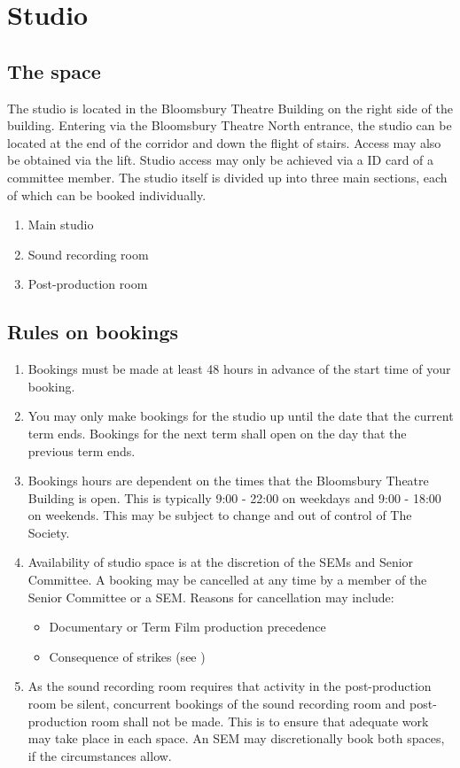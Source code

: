 \documentclass[]{article}
\begin{document}
\section{Studio}
\subsection{The space}\label{studioSpaces}
The studio is located in the Bloomsbury Theatre Building on the right side of the building. Entering via the Bloomsbury Theatre North entrance, the studio can be located at the end of the corridor and down the flight of stairs. Access may also be obtained via the lift. Studio access may only be achieved via a ID card of a committee member. The studio itself is divided up into three main sections, each of which can be booked individually.
\begin{enumerate}
    \item Main studio
    \item Sound recording room
    \item Post-production room
\end{enumerate}
\subsection{Rules on bookings}
\begin{enumerate}
    \item Bookings must be made at least 48 hours in advance of the start time of your booking.
    \item You may only make bookings for the studio up until the date that the current term ends. Bookings for the next term shall open on the day that the previous term ends.
    \item Bookings hours are dependent on the times that the Bloomsbury Theatre Building is open. This is typically 9:00 - 22:00 on weekdays and 9:00 - 18:00 on weekends. This may be subject to change and out of control of The Society.
    \item Availability of studio space is at the discretion of the SEMs and Senior Committee. A booking may be cancelled at any time by a member of the Senior Committee or a SEM. Reasons for cancellation may include:
          \begin{itemize}
              \item Documentary or Term Film production precedence
              \item Consequence of strikes (see )
          \end{itemize}
    \item As the sound recording room requires that activity in the post-production room be silent, concurrent bookings of the sound recording room and post-production room shall not be made. This is to ensure that adequate work may take place in each space. An SEM may discretionally book both spaces, if the circumstances allow.
\end{enumerate}
\end{document}
